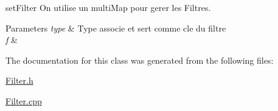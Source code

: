 set\-Filter On utilise un multi\-Map pour gerer les Filtres. 


\begin{DoxyParams}{Parameters}
{\em type} & Type associe et sert comme cle du filtre \\
\hline
{\em f} & \\
\hline
\end{DoxyParams}


The documentation for this class was generated from the following files\-:\begin{DoxyCompactItemize}
\item 
\hyperlink{_filter_8h}{Filter.\-h}\item 
\hyperlink{_filter_8cpp}{Filter.\-cpp}\end{DoxyCompactItemize}
